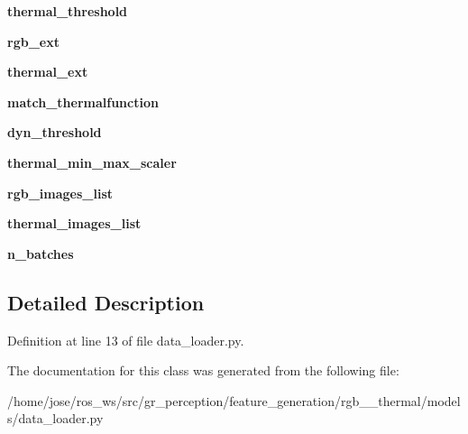 \begin{DoxyCompactItemize}
\item 
\mbox{\label{classmodels_1_1data__loader_1_1DataLoader_abea7095b4e651e84b617021f79463e93}} 
{\bfseries thermal\+\_\+threshold}
\item 
\mbox{\label{classmodels_1_1data__loader_1_1DataLoader_a9fb5abcb26604ab0aa2518e616ceff70}} 
{\bfseries rgb\+\_\+ext}
\item 
\mbox{\label{classmodels_1_1data__loader_1_1DataLoader_ae4406926e381111766f19fe31e73fb0d}} 
{\bfseries thermal\+\_\+ext}
\item 
\mbox{\label{classmodels_1_1data__loader_1_1DataLoader_a9b0d9f4a598585326de0949051eaca07}} 
{\bfseries match\+\_\+thermalfunction}
\item 
\mbox{\label{classmodels_1_1data__loader_1_1DataLoader_a6a82b1fb66d23b6535280f634a14caf3}} 
{\bfseries dyn\+\_\+threshold}
\item 
\mbox{\label{classmodels_1_1data__loader_1_1DataLoader_aecb2574045ceaa8a751d63b0572a7374}} 
{\bfseries thermal\+\_\+min\+\_\+max\+\_\+scaler}
\item 
\mbox{\label{classmodels_1_1data__loader_1_1DataLoader_a82de4309de75c79f8efe4aa052b2b333}} 
{\bfseries rgb\+\_\+images\+\_\+list}
\item 
\mbox{\label{classmodels_1_1data__loader_1_1DataLoader_a4616e96d697f1cdc71122b2f3b5d8db3}} 
{\bfseries thermal\+\_\+images\+\_\+list}
\item 
\mbox{\label{classmodels_1_1data__loader_1_1DataLoader_a715d340d9b87451c093404f3e7e6e042}} 
{\bfseries n\+\_\+batches}
\end{DoxyCompactItemize}


\subsection{Detailed Description}


Definition at line 13 of file data\+\_\+loader.\+py.



The documentation for this class was generated from the following file\+:\begin{DoxyCompactItemize}
\item 
/home/jose/ros\+\_\+ws/src/gr\+\_\+perception/feature\+\_\+generation/rgb\+\_\+\_\+thermal/models/data\+\_\+loader.\+py\end{DoxyCompactItemize}
